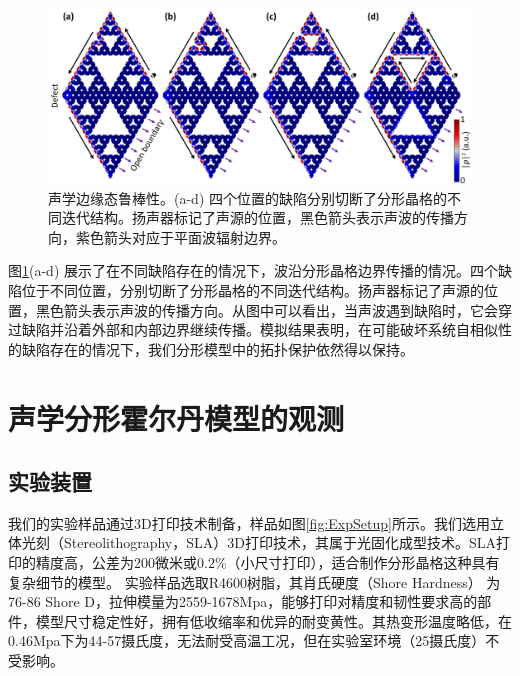 \begin{figure}[htbp]
    \centering
    \includegraphics[width=1\linewidth]{figure/FracHaldExp/ComsolDefect.png}
    \caption{声学边缘态鲁棒性。(a-d) 四个位置的缺陷分别切断了分形晶格的不同迭代结构。扬声器标记了声源的位置，黑色箭头表示声波的传播方向，紫色箭头对应于平面波辐射边界。}
    \label{fig:ComsolDefect}
\end{figure}

图\ref{fig:ComsolDefect}(a-d) 展示了在不同缺陷存在的情况下，波沿分形晶格边界传播的情况。四个缺陷位于不同位置，分别切断了分形晶格的不同迭代结构。扬声器标记了声源的位置，黑色箭头表示声波的传播方向。从图中可以看出，当声波遇到缺陷时，它会穿过缺陷并沿着外部和内部边界继续传播。模拟结果表明，在可能破坏系统自相似性的缺陷存在的情况下，我们分形模型中的拓扑保护依然得以保持。

\section{声学分形霍尔丹模型的观测}
\subsection{实验装置}
我们的实验样品通过3D打印技术制备，样品如图\ref{fig:ExpSetup}所示。我们选用立体光刻（Stereolithography，SLA）3D打印技术，其属于光固化成型技术。SLA打印的精度高，公差为200微米或$0.2\%$（小尺寸打印），适合制作分形晶格这种具有复杂细节的模型。 实验样品选取R4600树脂，其肖氏硬度（Shore Hardness） 为76-86 Shore D，拉伸模量为2559-1678Mpa，能够打印对精度和韧性要求高的部件，模型尺寸稳定性好，拥有低收缩率和优异的耐变黄性。其热变形温度略低，在0.46Mpa下为44-57摄氏度，无法耐受高温工况，但在实验室环境（25摄氏度）不受影响。

